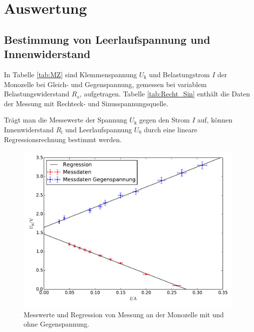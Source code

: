 \newpage
\section{Auswertung}
\label{sec:Auswertung}
\subsection{Bestimmung von Leerlaufspannung und Innenwiderstand}
In Tabelle \ref{tab:MZ} sind Klemmenspannung $U_\mathup{k}$ und Belastungstrom $I$ der Monozelle bei Gleich- und Gegenspannung, gemessen bei variablem Belastungswiderstand $R_\mathup{a}$, aufgetragen. Tabelle \ref{tab:Recht_Sin} enthält die Daten der Messung mit Rechteck- und Sinusspannungsquelle.



Trägt man die Messewerte der Spannung $U_\mathup{k}$ gegen den Strom $I$ auf, können Innenwiderstand $R_\mathup{i}$ und Leerlaufspannung $U_0$ durch eine lineare Regressionsrechnung bestimmt werden. 
\begin{figure}[h]
	\centering
	\label{fig:MZ}
	\includegraphics[width=\textwidth]{content/plot_MZ.pdf}
	\caption{Messwerte und Regression von Messung an der Monozelle mit und ohne Gegenspannung.}
\end{figure}
